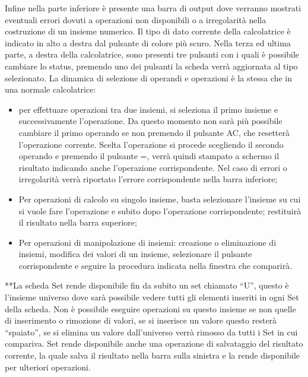\documentclass[a4paper,10pt]{article}
\begin{document}
        Infine nella parte inferiore è presente una barra di output dove verranno mostrati eventuali errori dovuti a operazioni non disponibili o a irregolarità nella costruzione di un insieme numerico.
        Il tipo di dato corrente della calcolatrice è indicato in alto a destra dal pulsante di colore più scuro.
        Nella terza ed ultima parte, a destra della calcolatrice, sono presenti tre pulsanti con i quali è possibile cambiare lo status, premendo uno dei pulsanti la scheda verrà aggiornata al tipo selezionato. La dinamica di selezione di operandi e operazioni è la stessa che in una normale calcolatrice: 
        \begin{itemize}
            \item per effettuare operazioni tra due insiemi, si seleziona il primo insieme e successivamente l’operazione. Da questo momento non sarà più possibile cambiare il primo operando se non premendo il pulsante AC, che resetterà l’operazione corrente. Scelta l’operazione si procede scegliendo il secondo operando e premendo il pulsante =, verrà quindi stampato a schermo il risultato indicando anche l’operazione corrispondente. Nel caso di errori o irregolarità verrà riportato l’errore corrispondente nella barra inferiore;
            \item Per operazioni di calcolo su singolo insieme, basta selezionare l’insieme su cui si vuole fare l’operazione e subito dopo l’operazione corrispondente; restituirà il risultato nella barra superiore;
            \item Per operazioni di manipolazione di insiemi: creazione o eliminazione di insiemi, modifica dei valori di un insieme, selezionare il pulsante corrispondente e seguire la procedura indicata nella finestra che comparirà.

        \end{itemize}

        **La scheda Set rende disponibile fin da subito un set chiamato “U”, questo è l’insieme universo dove sarà possibile vedere tutti gli elementi inseriti in ogni Set della scheda. Non è possibile eseguire operazioni su questo insieme se non quelle di inserimento o rimozione di valori, se si inserisce un valore questo resterà “spaiato”, se si elimina un valore dall’universo verrà rimosso da tutti i Set in
        cui compariva.
        Set rende disponibile anche una operazione di salvataggio del risultato corrente, la quale salva il risultato
        nella barra sulla sinistra e la rende disponibile per ulteriori operazioni.
\end{document}
